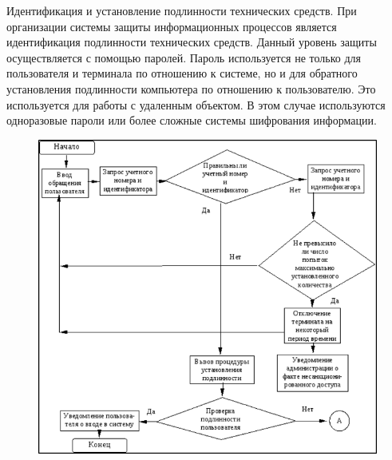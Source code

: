 \documentclass[a4paper,12pt]{extarticle}
\begin{document}
	Идентификация и установление подлинности технических средств. При организации системы защиты информационных процессов является идентификация подлинности технических средств. Данный уровень защиты осуществляется с помощью паролей. Пароль используется не только для пользователя и терминала по отношению к системе, но и для обратного установления подлинности компьютера по отношению к пользователю. Это используется для работы с удаленным объектом. В этом случае используются одноразовые пароли или более сложные системы шифрования информации. 
	\begin{figure}
		\centering
		\includegraphics[width=0.7\linewidth]{screenshot003}
		\caption{}
		\label{fig:screenshot003}
	\end{figure}
	
\end{document}
